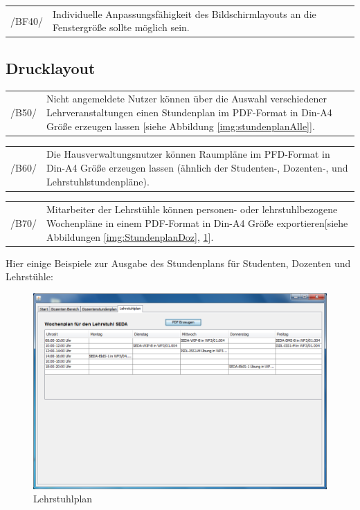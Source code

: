 \begin{tabular}{p{1.5cm}p{14.5cm}}
 /BF40/	& Individuelle Anpassungsfähigkeit des Bildschirmlayouts an die Fenstergröße sollte möglich sein. \\[0.25cm]	 
\end{tabular}

\subsection{Drucklayout}

\begin{tabular}{p{1.5cm}p{14.5cm}}
 /B50/	& Nicht angemeldete Nutzer können über die Auswahl verschiedener Lehrveranstaltungen einen Stundenplan im PDF-Format in Din-A4 Größe erzeugen lassen [siehe Abbildung \ref{img:stundenplanAlle}]. \\[0.25cm]	 
\end{tabular}

\begin{tabular}{p{1.5cm}p{14.5cm}}
 /B60/	& Die Hausverwaltungsnutzer können Raumpläne im PFD-Format in Din-A4 Größe erzeugen lassen (ähnlich der Studenten-, Dozenten-, und Lehrstuhlstundenpläne). \\[0.25cm]	 
\end{tabular}

\begin{tabular}{p{1.5cm}p{14.5cm}}
 /B70/	& Mitarbeiter der Lehrstühle können personen- oder lehrstuhlbezogene Wochenpläne in einem PDF-Format in Din-A4 Größe exportieren[siehe Abbildungen \ref{img:StundenplanDoz}, \ref{img:LehrstuhlplanDoz}]. \\[0.25cm]	 
\end{tabular}

Hier einige Beispiele zur Ausgabe des Stundenplans für Studenten, Dozenten und Lehrstühle:
\begin{figure}[H]
\begin{center}
\includegraphics[width=150mm]{images/section_7/DozentenLehrstuhlplan.PNG}
\caption{Lehrstuhlplan}
\label{img:LehrstuhlplanDoz}
\end{center}
\end{figure}

